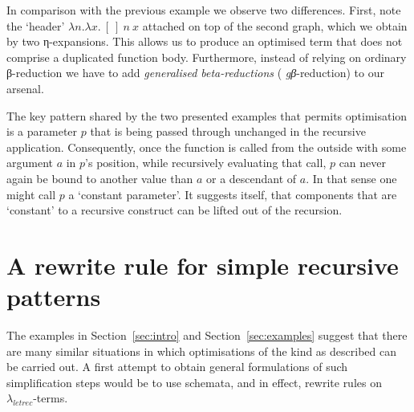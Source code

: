 \documentclass[submission,copyright,creativecommons]{eptcs}
\newcommand{\lambdaletrec}{\ensuremath{\lambda_\textit{letrec}}}
\newcommand{\nbd}{\nobreakdash}
\renewcommand\;{\,}
\begin{document}
In comparison with the previous example we observe two differences. First, note
the `header' $λn.λx.~[~]~n~x$ attached on top of the second graph, which we
obtain by two η-expansions. This allows us to produce an optimised term that does
not comprise a duplicated function body. Furthermore, instead of relying
on ordinary β-reduction we have to add {\it generalised beta-reductions} ({\it
gβ}-reduction) \cite{kama:nede:1995} to our arsenal.



The key pattern shared by the two presented examples that permits optimisation
is a parameter $p$ that is being passed through
unchanged in the recursive application. Consequently, once the function is
called from the outside with some argument $a$ in $p$'s position, while
recursively evaluating that call, $p$ can never again be bound to another value
than $a$ or a descendant of $a$. In that sense one might call $p$ a `constant
parameter'. It suggests itself, that components that are `constant' to a
recursive construct can be lifted out of the recursion.

\section{A rewrite rule for simple recursive patterns}
\label{sec:rules}


The examples in Section~\ref{sec:intro} and Section~\ref{sec:examples} 
suggest that there are many similar situations
in which optimisations of the kind as described can be carried out. 
A first attempt to obtain general formulations of such simplification steps
would be to use schemata, and in effect, rewrite rules on \lambdaletrec\nbd-terms.    
\end{document}
